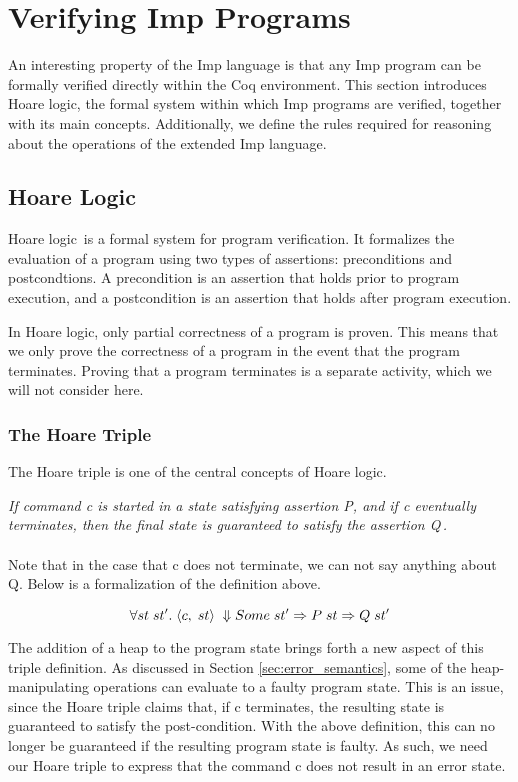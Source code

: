 \section{Verifying Imp Programs}
An interesting property of the Imp language is that any Imp program can be formally verified directly within the Coq environment. This section introduces Hoare logic, the formal system within which Imp programs are verified, together with its main concepts. Additionally, we define the rules required for reasoning about the operations of the extended Imp language.
\subsection{Hoare Logic}
Hoare logic\,\cite{Hoare69anaxiomatic} is a formal system for program verification. It formalizes the evaluation of a program using two types of assertions: preconditions and postcondtions. A precondition is an assertion that holds prior to program execution, and a postcondition is an assertion that holds after program execution.

In Hoare logic, only partial correctness of a program is proven. This means that we only prove the correctness of a program in the event that the program terminates. Proving that a program terminates is a separate activity, which we will not consider here.
\subsubsection{The Hoare Triple}
The Hoare triple is one of the central concepts of Hoare logic.

 \textit{If command c is started in a state satisfying assertion P, and if c eventually terminates, then the final state is guaranteed to satisfy the assertion Q}\,\cite{Pierce:SF}\textit{.}

\paragraph{}
Note that in the case that c does not terminate, we can not say anything about Q. Below is a formalization of the definition above.

\[
\forall st\;st'.\;\langle c,\;st\rangle\;\Downarrow Some\; st' \Rightarrow P\;st \Rightarrow Q\;st'
\]

The addition of a heap to the program state brings forth a new aspect of this triple definition. As discussed in Section \ref{sec:error_semantics}, some of the heap-manipulating operations can evaluate to a faulty program state. This is an issue, since the Hoare triple claims that, if c terminates, the resulting state is guaranteed to satisfy the post-condition. With the above definition, this can no longer be guaranteed if the resulting program state is faulty. As such, we need our Hoare triple to express that the command c does not result in an error state.

